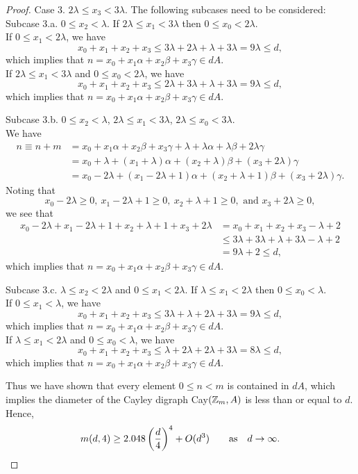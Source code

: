 \begin{proof}
Case 3. $2 \lambda \leq x_3 < 3 \lambda$. The following subcases need to be considered:\\
Subcase 3.a. $0 \leq x_2 <  \lambda.$ If $2 \lambda \leq x_1 < 3 \lambda$ then $0 \leq x_0 < 2\lambda$. \\
If $0 \leq x_1 < 2\lambda$, we have 
\[ x_0 + x_1 + x_2 + x_3 \leq 3 \lambda + 2 \lambda + \lambda + 3\lambda = 9\lambda \leq d, \]
which implies that $n = x_0 + x_1\alpha + x_2\beta + x_3\gamma \in dA$. \\
If $2 \lambda \leq x_1 < 3 \lambda$ and  $0 \leq x_0 < 2\lambda$, we have 
\[ x_0 + x_1 + x_2 + x_3 \leq 2\lambda + 3\lambda + \lambda + 3 \lambda = 9\lambda \leq d, \]
which implies that $n = x_0 + x_1\alpha + x_2\beta + x_3\gamma \in dA$. 

Subcase 3.b. $0 \leq x_2 <  \lambda$, $ 2\lambda \leq x_1 < 3\lambda$,  $2 \lambda \leq x_0 < 3\lambda$. \\
We have
\begin{align*}
n \equiv n + m &= x_0 + x_1\alpha + x_2\beta + x_3\gamma + \lambda + \lambda \alpha + \lambda \beta + 2 \lambda \gamma\\
&=  x_0 + \lambda + (x_1 + \lambda) \alpha + (x_2 + \lambda) \beta + (x_3 + 2 \lambda) \gamma\\ 
&=  x_0 -  2\lambda + (x_1 - 2 \lambda + 1) \alpha + (x_2 + \lambda + 1) \beta + (x_3 + 2 \lambda )\gamma.
\end{align*}
Noting that
\[  x_0 -  2\lambda \geq 0,  \ x_1 - 2 \lambda + 1 \geq 0, \  x_2 + \lambda + 1 \geq 0, \text{ and } x_3 + 2 \lambda \geq 0, \]
we see that 
\begin{align*}
x_0 -  2\lambda + x_1 - 2 \lambda + 1 + x_2  + \lambda + 1 + x_3 + 2 \lambda &= x_0  + x_1 +  x_2 + x_3 -  \lambda + 2 \\
&\leq 3 \lambda + 3 \lambda + \lambda + 3\lambda - \lambda + 2\\
&= 9 \lambda + 2 \leq d,
\end{align*}
which implies that $n = x_0 + x_1\alpha + x_2\beta + x_3\gamma \in dA$.

Subcase 3.c. $\lambda \leq x_2 < 2 \lambda$ and $0 \leq x_1 < 2\lambda$.  If $\lambda \leq x_1 < 2 \lambda$ then $0 \leq x_0 < \lambda$. \\
If $0 \leq x_1 < \lambda$, we have 
\[ x_0 + x_1 + x_2 + x_3 \leq 3\lambda + \lambda + 2\lambda + 3\lambda = 9\lambda \leq d, \]
which implies that $n = x_0 + x_1\alpha + x_2\beta + x_3\gamma \in dA$. \\
If $ \lambda \leq x_1 < 2 \lambda$ and  $0 \leq x_0 < \lambda$, we have 
\[ x_0 + x_1 + x_2 + x_3 \leq \lambda + 2\lambda + 2 \lambda + 3 \lambda = 8\lambda \leq d, \]
which implies that $n = x_0 + x_1\alpha + x_2\beta + x_3\gamma \in dA$.

Thus we have shown that every element $0 \leq n < m$ is contained in $dA$, which implies the diameter of the Cayley digraph Cay$(\mbox{$\mathbb Z$}_m, A)$ is less than or equal to $d$. 
Hence,
\[
m(d, 4) \geq2.048 \left(\frac{d}{4}\right)^4  +O(d^3)\qquad\text{as}\quad d\to\infty. \qedhere
\]
\end{proof}
